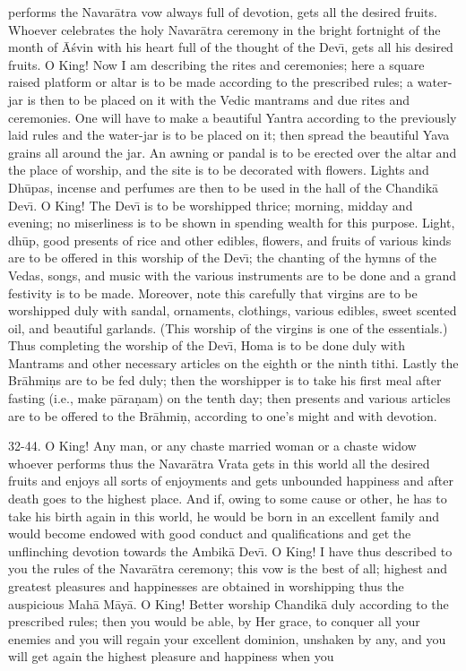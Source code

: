 performs the Navar\=atra vow always full of devotion, gets all the desired fruits. Whoever celebrates the holy Navar\=atra ceremony in the bright fortnight of the month of \=A\'svin with his heart full of the thought of the Dev\={\i}, gets all his desired fruits. O King! Now I am describing the rites and ceremonies; here a square raised platform or altar is to be made according to the prescribed rules; a water-jar is then to be placed on it with the Vedic mantrams and due rites and ceremonies. One will have to make a beautiful Yantra according to the previously laid rules and the water-jar is to be placed on it; then spread the beautiful Yava grains all around the jar. An awning or pandal is to be erected over the altar and the place of worship, and the site is to be decorated with flowers. Lights and Dh\=upas, incense and perfumes are then to be used in the hall of the Chandik\=a Dev\={\i}. O King! The Dev\={\i} is to be worshipped thrice; morning, midday and evening; no miserliness is to be shown in spending wealth for this purpose. Light, dh\=up, good presents of rice and other edibles, flowers, and fruits of various kinds are to be offered in this worship of the Dev\={\i}; the chanting of the hymns of the Vedas, songs, and music with the various instruments are to be done and a grand festivity is to be made. Moreover, note this carefully that virgins are to be worshipped duly with sandal, ornaments, clothings, various edibles, sweet scented oil, and beautiful garlands. (This worship of the virgins is one of the essentials.) Thus completing the worship of the Dev\={\i}, Homa is to be done duly with Mantrams and other necessary articles on the eighth or the ninth tithi. Lastly the Br\=ahmi\d{n}s are to be fed duly; then the worshipper is to take his first meal after fasting (i.e., make p\=ara\d{n}am) on the tenth day; then presents and various articles are to be offered to the Br\=ahmi\d{n}, according to one's might and with devotion.

32-44. O King! Any man, or any chaste married woman or a chaste widow whoever performs thus the Navar\=atra Vrata gets in this world all the desired fruits and enjoys all sorts of enjoyments and gets unbounded happiness and after death goes to the highest place. And if, owing to some cause or other, he has to take his birth again in this world, he would be born in an excellent family and would become endowed with good conduct and qualifications and get the unflinching devotion towards the Ambik\=a Dev\={\i}. O King! I have thus described to you the rules of the Navar\=atra ceremony; this vow is the best of all; highest and greatest pleasures and happinesses are obtained in worshipping thus the auspicious Mah\=a M\=ay\=a. O King! Better worship Chandik\=a duly according to the prescribed rules; then you would be able, by Her grace, to conquer all your enemies and you will regain your excellent dominion, unshaken by any, and you will get again the highest pleasure and happiness when you


